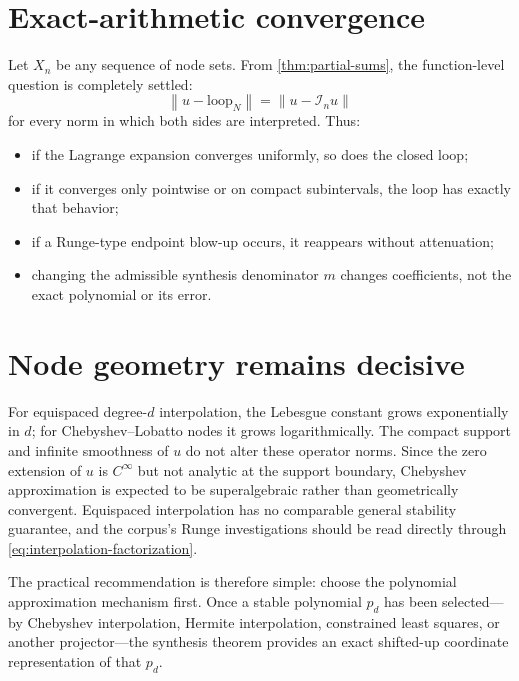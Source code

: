 \documentclass[11pt,oneside]{book}
\theoremstyle{definition}
\theoremstyle{remark}
\newcommand{\Iop}{\mathcal I}
\newcommand{\norm}[1]{\left\lVert#1\right\rVert}
\begin{document}
\section{Exact-arithmetic convergence}
Let \(X_n\) be any sequence of node sets.  From \cref{thm:partial-sums}, the function-level question is completely settled:
\begin{equation}
 \norm{u-\text{loop}_N}
 =\norm{u-\Iop_nu}
 \label{eq:loop-error}
\end{equation}
for every norm in which both sides are interpreted.  Thus:
\begin{itemize}
\item if the Lagrange expansion converges uniformly, so does the closed loop;
\item if it converges only pointwise or on compact subintervals, the loop has exactly that behavior;
\item if a Runge-type endpoint blow-up occurs, it reappears without attenuation;
\item changing the admissible synthesis denominator \(m\) changes coefficients, not the exact polynomial or its error.
\end{itemize}

\section{Node geometry remains decisive}
For equispaced degree-\(d\) interpolation, the Lebesgue constant grows exponentially in \(d\); for Chebyshev--Lobatto nodes it grows logarithmically.  The compact support and infinite smoothness of \(u\) do not alter these operator norms.  Since the zero extension of \(u\) is \(C^\infty\) but not analytic at the support boundary, Chebyshev approximation is expected to be superalgebraic rather than geometrically convergent.  Equispaced interpolation has no comparable general stability guarantee, and the corpus's Runge investigations should be read directly through \cref{eq:interpolation-factorization}.

The practical recommendation is therefore simple: choose the polynomial approximation mechanism first.  Once a stable polynomial \(p_d\) has been selected---by Chebyshev interpolation, Hermite interpolation, constrained least squares, or another projector---the synthesis theorem provides an exact shifted-up coordinate representation of that \(p_d\).
\end{document}
